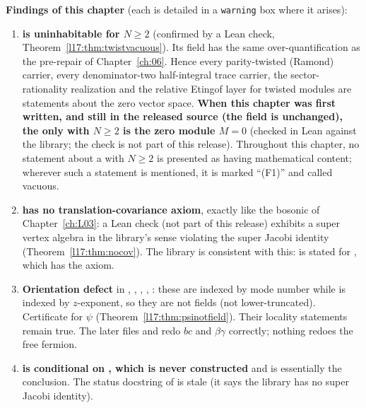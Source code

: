 \textbf{Findings of this chapter} (each is detailed in a \texttt{warning} box where it arises):
\begin{enumerate}[label=(F\arabic*)]
\item \textbf{ is uninhabitable for $N\ge 2$} (confirmed by a Lean
  check, Theorem~\ref{l17:thm:twistvacuous}). Its  field has the same
  over-quantification as the pre-repair  of Chapter~\ref{ch:06}. Hence
  every parity-twisted (Ramond) carrier, every denominator-two half-integral trace carrier, the
  sector-rationality realization and the relative Etingof layer for twisted modules are statements
  about the zero vector space. \textbf{When this chapter was first written, and still in the released source (the  field is
  unchanged), the only  with $N\ge2$ is the zero module $M=0$} (checked in Lean against the library;
  the check is not part of this release).
  Throughout this chapter, no statement about a  with $N\ge2$ is presented
  as having mathematical content; wherever such a statement is mentioned, it is marked ``(F1)'' and
  called vacuous.
\item \textbf{ has no translation-covariance axiom}, exactly like the bosonic
   of Chapter~\ref{ch:L03}: a Lean check (not part of this release) exhibits a super vertex algebra in
  the library's sense violating the super Jacobi identity (Theorem~\ref{l17:thm:nocov}). The library
  is consistent with this:  is stated for , which has the axiom.
\item \textbf{Orientation defect} in , ,
  , , : these are indexed by mode
  number while  is indexed by $z$-exponent, so they are not fields (not
  lower-truncated). Certificate for $\psi$ (Theorem~\ref{l17:thm:psinotfield}). Their locality
  statements remain true. The later files  and
   redo $bc$ and $\beta\gamma$ correctly; nothing redoes the free
  fermion.
\item \textbf{ is conditional on
  , which is never constructed} and is essentially the
  conclusion. The status docstring of  is stale (it says the
  library has no super Jacobi identity).

\end{enumerate}
